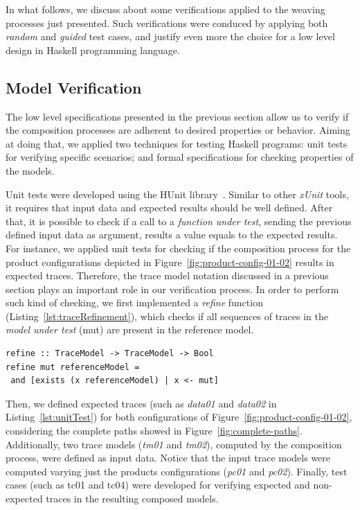 \documentclass{acm_proc_article-sp}
\begin{document}
{In what follows, we discuss about some verifications applied to the weaving processes just presented. Such verifications were conduced by applying both \emph{random} and \emph{guided} test cases, and justify even more the choice for a low level design in Haskell programming language. 

\subsection{Model Verification}\label{sub:model-verification}

The low level specifications presented in the 
previous section allow us to verify if the composition 
processes are adherent to desired properties or behavior. 
Aiming at doing that, we applied two techniques for testing 
Haskell programs: unit tests for verifying specific scenarios; and 
formal specifications for checking properties of the models. 

Unit tests were developed using the HUnit library~\cite{hunit-tutorial}. 
Similar to other \emph{xUnit} tools, it requires that input data and 
expected results should be well defined. After that, it is possible to check if 
a call to a \emph{function under test}, sending the previous defined input data as 
argument, results a value equals to the expected results. 
For instance, we applied unit tests for checking if the composition process 
for the product configurations depicted in Figure~\ref{fig:product-config-01-02} 
results in expected traces. Therefore, the trace model notation discussed in 
a previous section plays an important role in our verification process. 
In order to perform such kind of checking, we first implemented 
a \emph{refine} function (Listing~\ref{lst:traceRefinement}), 
which checks if all sequences of traces in the \emph{model under test} (mut) are 
present in the reference model. 

\begin{lstlisting}[belowskip=10pt,frame=tb,caption={The \emph{traceRefinement} function},label=lst:traceRefinement]
refine :: TraceModel -> TraceModel -> Bool
refine mut referenceModel = 
 and [exists (x referenceModel) | x <- mut]
\end{lstlisting}

Then, we defined expected traces (such as \emph{data01} and 
\emph{data02} in Listing~\ref{lst:unitTest}) for both configurations 
of Figure~\ref{fig:product-config-01-02}, considering the complete paths 
showed in Figure~\ref{fig:complete-paths}. Additionally, two trace models
(\emph{tm01} and \emph{tm02}), computed by the composition process, were defined 
as input data. Notice that the input trace models were computed varying just the 
products configurations (\emph{pc01} and \emph{pc02}). 
Finally, test cases (such as tc01 and tc04) were developed 
for verifying expected and non-expected traces in the resulting composed models. 

}
\end{document}

